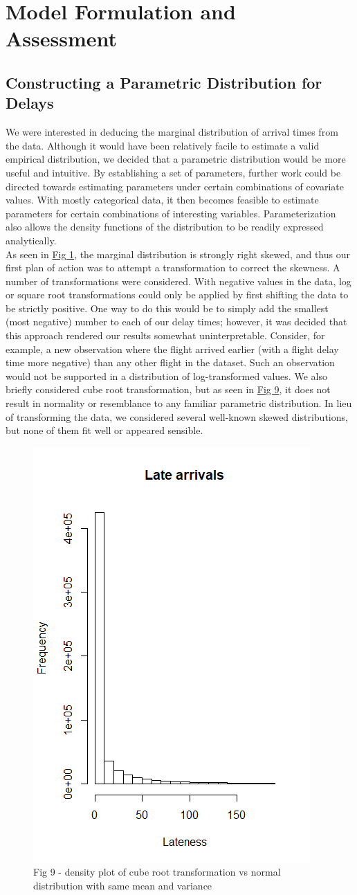 \documentclass[12pt, a4paper]{book}
\newcommand\tab[1][1cm]{\hspace*{#1}}
\begin{document}
\chapter{Model Formulation and Assessment}
	\section{Constructing a Parametric Distribution for Delays}
	 \tab We were interested in deducing the marginal distribution of arrival times from the data. Although it would have been relatively facile to estimate a valid empirical distribution, we decided that a parametric distribution would be more useful and intuitive. By establishing a set of parameters, further work could be directed towards estimating parameters under certain combinations of covariate values. With mostly categorical data, it then becomes feasible to estimate parameters for certain combinations of interesting variables. Parameterization also allows the density functions of the distribution to be readily expressed analytically.\\
	\tab As seen in \underline{Fig 1}, the marginal distribution is strongly right skewed, and thus our first plan of action was to attempt a transformation to correct the skewness. A number of transformations were considered. With negative values in the data, log or square root transformations could only be applied by first shifting the data to be strictly positive. One way to do this would be to simply add the smallest (most negative) number to each of our delay times; however, it was decided that this approach rendered our results somewhat uninterpretable. Consider, for example, a new observation where the flight arrived earlier (with a flight delay time more negative) than any other flight in the dataset. Such an observation would not be supported in a distribution of log-transformed values. We also briefly considered cube root transformation, but as seen in \underline{Fig 9}, it does not result in normality or resemblance to any familiar parametric distribution. In lieu of transforming the data, we considered several well-known skewed distributions, but none of them fit well or appeared sensible.\\
			\begin{figure}
			\centering
	 		\includegraphics[width = .35 \textwidth]{../figures/LateArrivalsHistogram}
	 		\caption{Fig 9 - density plot of cube root transformation vs normal distribution with same mean and variance}
	 		\end{figure}
\end{document}
